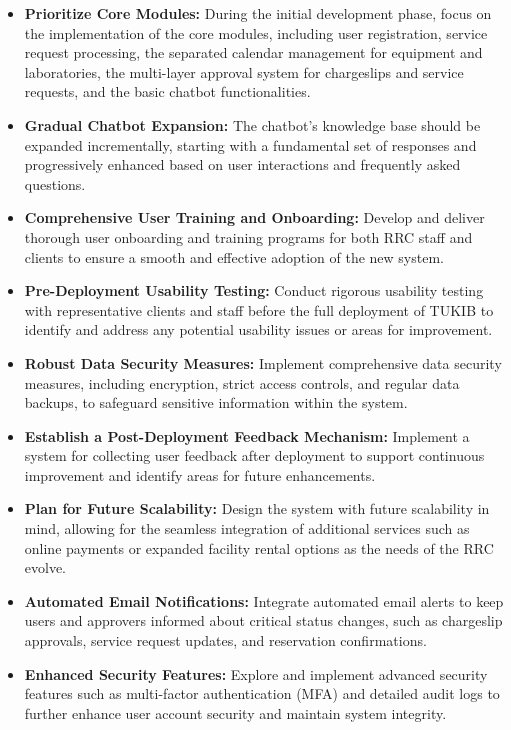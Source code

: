 \begin{itemize}
\item \textbf{Prioritize Core Modules:} During the initial development phase, focus on the implementation of the core modules, including user registration, service request processing, the separated calendar management for equipment and laboratories, the multi-layer approval system for chargeslips and service requests, and the basic chatbot functionalities.

\item \textbf{Gradual Chatbot Expansion:} The chatbot's knowledge base should be expanded incrementally, starting with a fundamental set of responses and progressively enhanced based on user interactions and frequently asked questions.

\item \textbf{Comprehensive User Training and Onboarding:} Develop and deliver thorough user onboarding and training programs for both RRC staff and clients to ensure a smooth and effective adoption of the new system.

\item \textbf{Pre-Deployment Usability Testing:} Conduct rigorous usability testing with representative clients and staff before the full deployment of TUKIB to identify and address any potential usability issues or areas for improvement.

\item \textbf{Robust Data Security Measures:} Implement comprehensive data security measures, including encryption, strict access controls, and regular data backups, to safeguard sensitive information within the system.

\item \textbf{Establish a Post-Deployment Feedback Mechanism:} Implement a system for collecting user feedback after deployment to support continuous improvement and identify areas for future enhancements.

\item \textbf{Plan for Future Scalability:} Design the system with future scalability in mind, allowing for the seamless integration of additional services such as online payments or expanded facility rental options as the needs of the RRC evolve.

\item \textbf{Automated Email Notifications:} Integrate automated email alerts to keep users and approvers informed about critical status changes, such as chargeslip approvals, service request updates, and reservation confirmations.
\item \textbf{Enhanced Security Features:} Explore and implement advanced security features such as multi-factor authentication (MFA) and detailed audit logs to further enhance user account security and maintain system integrity.
\end{itemize}
